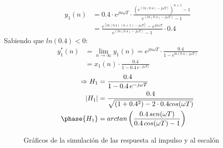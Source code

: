 \documentclass[../../guia1.tex]{subfiles}
\begin{document}
\begin{align*}
	y_1(n) &= 0.4\cdot e^{jn\omega T}\cdot \frac{\left({e^{(ln(0.4)-j\omega T)}}\right)^{n+1}-1}{e^{(ln(0.4)-j\omega T)}-1}\\
		&= \frac{e^{[ln(0.4)(n+1)-j\omega T]} - e^{jn\omega T}}{e^{(ln(0.4)-j\omega T)}-1}\cdot 0.4
\end{align*}
Sabiendo que $ln(0.4) < 0$:
\begin{align*}
	y_1^*(n) &= \lim_{n\rightarrow \infty} y_1(n) = e^{jn\omega T}\cdot \frac{0.4}{1-e^{ln(0.4 - j\omega T)}}\\
			&= x_1(n)\cdot  \frac{0.4}{1-0.4 \,e^{- j\omega T)}}
\end{align*}
\begin{align*}
	\Rightarrow H_1 &= \frac{0.4}{1-0.4\,e^{-j\omega T}}\\
	|H_1| &= \frac{0.4}{\sqrt{(1+0.4^2)-2\cdot 0.4 cos(\omega T)}}\\
	\phase{H_1} &= arctan\left( \frac{0.4\, sen(\omega T)}{0.4\, cos(\omega T) - 1} \right)
\end{align*}

\begin{figure}[H]
 \centering

 \caption{Gráficos de la simulación de las respuesta al impulso y al escalón}
 \label{f:eja}
\end{figure}
\end{document}
